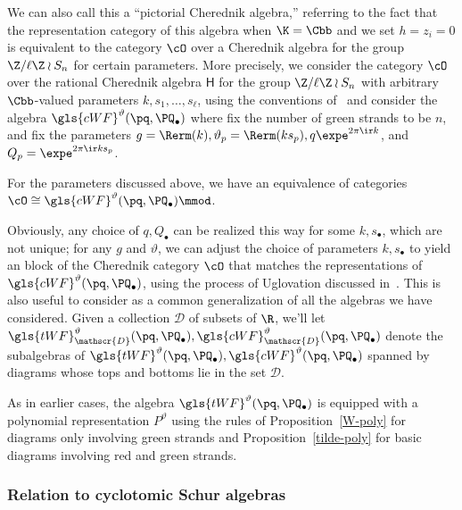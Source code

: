 We can also call this a ``pictorial
 Cherednik algebra,'' referring to the fact that the representation
 category of this algebra when $\K=\Cbb$ and we set $h=z_i=0$ is
 equivalent to the category
 $\cO$ over a Cherednik algebra for the group $\Z/\ell\Z\wr S_n$ for
 certain parameters. More precisely, we consider the category $\cO$ over the
 rational Cherednik algebra $\mathsf{H}$ for the group $\Z/\ell\Z\wr
 S_n$ with arbitrary $\Cbb$-valued parameters $k,
 s_1,\dots, s_\ell$, using the conventions of~\cite[\S~2.1]{WebRou}
 and consider the algebra
 $\gls{cWF}^\vartheta (\pq,\PQ_{\bullet})$ where fix the
 number of green strands to be $n$, and fix the parameters $g=\Rerm(k),
 \vartheta_p=\Rerm(ks_p), q\expe^{2\pi \ir k}$, and $Q_p=\expe^{2\pi \ir k s_p}$.
 \begin{theorem}
 For the parameters discussed above, we have an equivalence of
 categories $\cO\cong
 \gls{cWF}^\vartheta (\pq,\PQ_{\bullet})\mmod$. 
\end{theorem}
Obviously, any choice of $q,Q_\bullet$ can be realized this way for
some $k,s_\bullet$, which are not unique; for any $g$ and $\vartheta$,
we can adjust the choice of parameters $ k,s_\bullet$ to yield an
block of the Cherednik category $\cO$ that matches the representations
of $\gls{cWF}^\vartheta (\pq,\PQ_{\bullet})$, using the process
of Uglovation discussed in~\cite[Def.~2.8]{WebRou}.
 This is also useful to consider as a common generalization of all
 the algebras we have considered. 
Given a collection ${\mathscr{D}}$ of subsets of $\R$, we'll let $\gls{tWF}^\vartheta_{\mathscr{D}}
(\pq,\PQ_{\bullet}),\gls{cWF}_{\mathscr{D}}^\vartheta (\pq,\PQ_{\bullet})$
denote the subalgebras of $\gls{tWF}^\vartheta
(\pq,\PQ_{\bullet}), \gls{cWF}^\vartheta (\pq,\PQ_{\bullet})$ spanned by
diagrams whose tops and bottoms lie in the set ${\mathscr{D}}$. 

As in earlier cases, the algebra $\gls{tWF}^\vartheta (\pq,\PQ_{\bullet})$
 is equipped with a polynomial representation $P^\vartheta$ using the rules of
 Proposition~\ref{W-poly} for diagrams only involving green strands and
 Proposition~\ref{tilde-poly} for basic diagrams involving red and
 green strands.

 \subsubsection{Relation to cyclotomic Schur algebras}
\label{sec:relation-hecke-schur}


